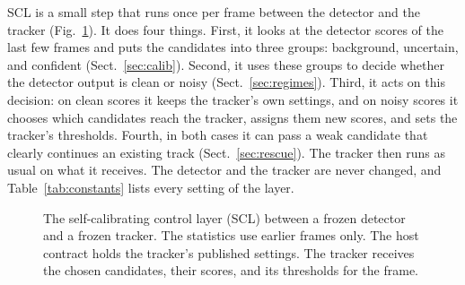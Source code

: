 \documentclass[pdflatex,sn-mathphys-num,iicol]{sn-jnl}
\makeatletter
\def\sectionfont{\reset@font\fontfamily{\rmdefault}\fontsize{11bp}{13bp}\bfseries\selectfont\raggedright\boldmath}
\renewcommand\section{\@startsection{section}{1}{\z@}{-8pt \@plus -2pt \@minus -2pt}{4pt}{\sectionfont}}
\newcommand{\scl}{SCL}
\makeatother
\begin{document}
\section{Method}\label{sec:method}

\scl{} is a small step that runs once per frame between the detector and the
tracker (Fig.~\ref{fig:arch}). It does four things. First, it looks at the
detector scores of the last few frames and puts the candidates into three
groups: background, uncertain, and confident (Sect.~\ref{sec:calib}).
Second, it uses these groups to decide whether the detector output is clean
or noisy (Sect.~\ref{sec:regimes}). Third, it acts on this decision: on
clean scores it keeps the tracker's own settings, and on noisy scores it
chooses which candidates reach the tracker, assigns them new scores, and sets
the tracker's thresholds. Fourth, in both cases it can pass a weak candidate
that clearly continues an existing track (Sect.~\ref{sec:rescue}). The
tracker then runs as usual on what it receives. The detector and the tracker
are never changed, and Table~\ref{tab:constants} lists every setting of the
layer.

\begin{figure}[t]
\centering
{}
\caption{The self-calibrating control layer (\scl{}) between a frozen detector
and a frozen tracker. The statistics use earlier frames only. The host
contract holds the tracker's published settings. The tracker receives the
chosen candidates, their scores, and its thresholds for the frame.}
\label{fig:arch}
\end{figure}
\end{document}
